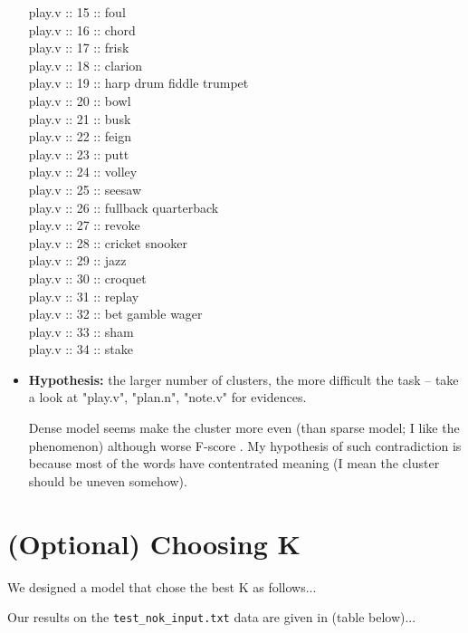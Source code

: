 \documentclass[12pt]{article}
\begin{document}
\begin{itemize}
	play.v :: 15 :: foul \\
	play.v :: 16 :: chord \\
	play.v :: 17 :: frisk \\
	play.v :: 18 :: clarion \\
	play.v :: 19 :: harp drum fiddle trumpet \\
	play.v :: 20 :: bowl \\
	play.v :: 21 :: busk \\
	play.v :: 22 :: feign \\
	play.v :: 23 :: putt \\
	play.v :: 24 :: volley \\
	play.v :: 25 :: seesaw \\
	play.v :: 26 :: fullback quarterback \\
	play.v :: 27 :: revoke \\
	play.v :: 28 :: cricket snooker \\
	play.v :: 29 :: jazz \\
	play.v :: 30 :: croquet \\
	play.v :: 31 :: replay \\
	play.v :: 32 :: bet gamble wager \\
	play.v :: 33 :: sham \\
	play.v :: 34 :: stake \\
	
	
	\item \textbf{ Hypothesis:} the larger number of clusters, the more difficult the task -- take a look at "play.v", "plan.n", "note.v" for evidences. 
	
	Dense model seems make the cluster more even (than sparse model; I like the phenomenon) although worse F-score . My hypothesis of such contradiction is because most of the words have contentrated meaning (I mean the cluster should be uneven somehow).
\end{itemize}


\section{(Optional) Choosing K}

We designed a model that chose the best K as follows...

Our results on the \texttt{test\_nok\_input.txt} data are given in (table below)...
\end{document}
